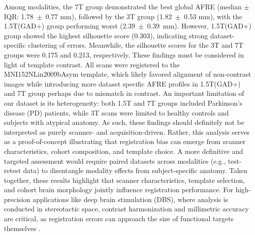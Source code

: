 Among modalities, the 7T group demonstrated the best global AFRE (median \(\pm\) IQR: 1.78~\(\pm\)~0.77 mm), followed by the 3T group (1.82~\(\pm\)~0.53 mm), with the 1.5T(GAD+) group performing worst (2.39~\(\pm\)~0.39~mm). However, 1.5T(GAD+) group showed the highest silhouette score (0.303), indicating strong dataset-specific clustering of errors. Meanwhile, the silhouette scores for the 3T and 7T groups were 0.175 and 0.213, respectively. These findings must be considered in light of template contrast. All scans were registered to the MNI152NLin2009bAsym template, which likely favored alignment of non-contrast images while introducing more dataset specific AFRE profiles in 1.5T(GAD+) and 7T group perhaps due to mismatch in contrast. An important limitation of our dataset is its heterogeneity: both 1.5T and 7T groups included Parkinson’s disease (PD) patients, while 3T scans were limited to healthy controls and subjects with atypical anatomy. As such, these findings should definitely not be interpreted as purely scanner- and acquisition-driven. Rather, this analysis serves as a proof-of-concept illustrating that registration bias can emerge from scanner characteristics, cohort composition, and template choice. A more definitive and targeted assessment would require paired datasets across modalities (e.g., test-retest data) to disentangle modality effects from subject-specific anatomy. Taken together, these results highlight that scanner characteristics, template selection, and cohort brain morphology jointly influence registration performance. For high-precision applications like deep brain stimulation (DBS), where analysis is conducted in stereotactic space, contrast harmonization and millimetric accuracy are critical, as registration errors can approach the size of functional targets themselves \cite{Hollunder2024-wc}.

